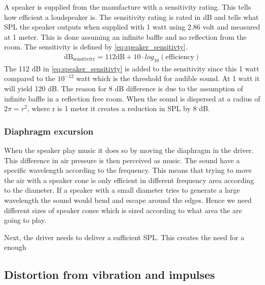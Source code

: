 A speaker is supplied from the manufacture with a sensitivity rating. This tells how efficient a loudspeaker is. The sensitivity rating is rated in dB and tells what \gls{SPL} the speaker outputs when supplied with 1 watt using 2.86 volt and measured at 1 meter. This is done assuming an infinite baffle and no reflection from the room. The sensitivity is defined by \autoref{eq:speaker_sensitivty}.
\begin{align}\label{eq:speaker_sensitivty}
\text{dB}_\text{sensitivity}=112\text {dB} +10 \cdot log_{10}(\text{efficiency})
\end{align}  
The 112 dB in \autoref{eq:speaker_sensitivty} is added to the sensitivity since this 1 watt compared to the $10^{-12}$ watt which is the threshold for audible sound. At 1 watt it will yield 120 dB. The reason for 8 dB difference is due to the assumption of infinite baffle in a reflection free room. When the sound is dispersed at a radius of $2\pi=r^2$, where r is 1 meter it creates a reduction in \gls{SPL} by 8 dB.

\subsubsection*{Diaphragm excursion}

When the speaker play music it does so by moving the diaphragm in the driver. This difference in air pressure is then perceived as music. The sound have a specific wavelength according to the frequency. This means that trying to move the air with a speaker cone is only efficient in different frequency area according to the diameter. If a speaker with a small diameter tries to generate a large wavelength the sound would bend and escape around the edges. Hence we need different sizes of speaker cones which is sized according to what area the are going to play.

Next, the driver needs to deliver a sufficient \gls{SPL}. This creates the need for a enough  


\subsection{Distortion from vibration and impulses}\label{subsec:impulses}

